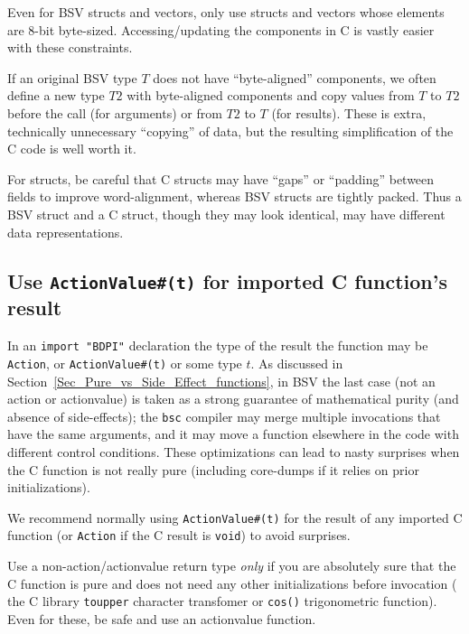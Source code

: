 Even for BSV structs and vectors, only use structs and vectors whose
elements are 8-bit byte-sized.  Accessing/updating the components in C
is vastly easier with these constraints.

If an original BSV type $T$ does not have ``byte-aligned'' components,
we often define a new type $T2$ with byte-aligned components and copy
values from $T$ to $T2$ before the call (for arguments) or from $T2$
to $T$ (for results).  These is extra, technically unnecessary
``copying'' of data, but the resulting simplification of the C code is
well worth it.

For structs, be careful that C structs may have ``gaps'' or
``padding'' between fields to improve word-alignment, whereas BSV
structs are tightly packed.  Thus a BSV struct and a C struct, though
they may look identical, may have different data representations.


\subsection{Use {\tt ActionValue\#(t)} for imported C function's result}

In an \verb|import "BDPI"| declaration the type of the result the
function may be \verb|Action|, or \verb|ActionValue#(t)| or some type
$t$.  As discussed in Section~\ref{Sec_Pure_vs_Side_Effect_functions},
in BSV the last case (not an action or actionvalue) is taken as a
strong guarantee of mathematical purity (and absence of side-effects);
the \verb|bsc| compiler may merge multiple invocations that have the
same arguments, and it may move a function elsewhere in the code with
different control conditions.  These optimizations can lead to nasty
surprises when the C function is not really pure (including core-dumps
if it relies on prior initializations).

We recommend normally using \verb|ActionValue#(t)| for the result of
any imported C function (or \verb|Action| if the C result is
\verb|void|) to avoid surprises.

Use a non-action/actionvalue return type \emph{only} if you are
absolutely sure that the C function is pure and does not need any
other initializations before invocation ({\eg} the C library
\verb|toupper| character transfomer or \verb|cos()| trigonometric
function).  Even for these, be safe and use an actionvalue function.


